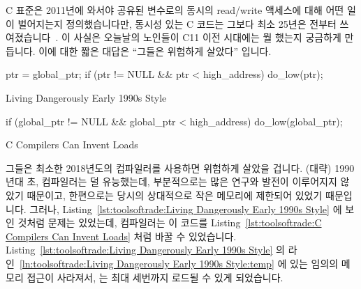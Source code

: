 C 표준은 2011년에 와서야 공유된 변수로의 동시의 read/write 액세스에 대해 어떤
일이 벌어지는지 정의했습니다만, 동시성 있는 C 코드는 그보다 최소 25년은 전부터
쓰여졌습니다~\cite{Beck85,Inman85}.
이 사실은 오늘날의 노인들이 C11 이전 시대에는 뭘 했는지 궁금하게 만듭니다.
이에 대한 짧은 대답은 ``그들은 위험하게 살았다'' 입니다.

\begin{listing}[tbp]
\begin{linelabel}
\begin{VerbatimL}[commandchars=\\\{\}]
ptr = global_ptr;
if (ptr != NULL && ptr < high_address)
	do_low(ptr);
\end{VerbatimL}
\end{linelabel}
\caption{Living Dangerously Early 1990s Style}
\label{lst:toolsoftrade:Living Dangerously Early 1990s Style}
\end{listing}

\begin{listing}[tbp]
\begin{linelabel}
\begin{VerbatimL}[commandchars=\\\{\}]
if (global_ptr != NULL &&
    global_ptr < high_address)
	do_low(global_ptr);
\end{VerbatimL}
\end{linelabel}
\caption{C Compilers Can Invent Loads}
\label{lst:toolsoftrade:C Compilers Can Invent Loads}
\end{listing}

그들은 최소한 2018년도의 컴파일러를 사용하면 위험하게 살았을 겁니다.
(대략) 1990년대 초, 컴파일러는 덜 유능했는데, 부분적으로는 많은 연구와 발전이
이루어지지 않았기 때문이고, 한편으로는 당시의 상대적으로 작은 메모리에 제한되어
있었기 때문입니다.
그러나,
Listing~\ref{lst:toolsoftrade:Living Dangerously Early 1990s Style} 에 보인
것처럼 문제는 있었는데, 컴파일러는 이 코드를
Listing~\ref{lst:toolsoftrade:C Compilers Can Invent Loads} 처럼 바꿀 수
있었습니다.
Listing~\ref{lst:toolsoftrade:Living Dangerously Early 1990s Style}
의 라인~\ref{ln:toolsoftrade:Living Dangerously Early 1990s Style:temp} 에 있는
임의의 메모리 접근이 사라져서,  는 최대 세번까지 로드될 수 있게
되었습니다.
\iffalse

